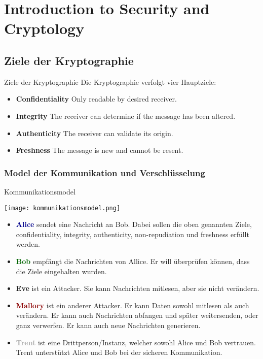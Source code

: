 \section{Introduction to Security and Cryptology}

\subsection{Ziele der Kryptographie}

\begin{definition}{Ziele der Kryptographie}
    Die Kryptographie verfolgt vier Hauptziele:
    \begin{itemize}
        \item \textbf{Confidentiality} Only readable by desired receiver.
        \item \textbf{Integrity} The receiver can determine if the message has been altered.
        \item \textbf{Authenticity} The receiver can validate its origin.
        \item \textbf{Freshness} The message is new and cannot be resent.
    \end{itemize}
\end{definition}


\subsubsection{Model der Kommunikation und Verschlüsselung}

\begin{definition}{Kommunikationsmodel}

    \texttt{[image: kommunikationsmodel.png]}

    \begin{itemize}
        \item \textcolor{darkblue}{\textbf{Alice}} sendet eine Nachricht an Bob. Dabei sollen die oben genannten Ziele, confidentiality, integrity, authenticity, non-repudiation und freshness erfüllt werden.
        \item \textcolor{darkgreen}{\textbf{Bob}} empfängt die Nachrichten von Allice. Er will überprüfen können, dass die Ziele eingehalten wurden.
        \item \textcolor{darktangerine}{\textbf{Eve}}  ist ein Attacker. Sie kann Nachrichten mitlesen, aber sie nicht verändern.
        \item \textcolor{darkred}{\textbf{Mallory}} ist ein anderer Attacker. Er kann Daten sowohl mitlesen als auch verändern. Er kann auch Nachrichten abfangen und später weitersenden, oder ganz verwerfen. Er kann auch neue Nachrichten generieren.
        \item \textcolor{darkgrey}{\textbf{Trent}} ist eine Drittperson/Instanz, welcher sowohl Alice und Bob vertrauen. Trent unterstützt Alice und Bob bei der sicheren Kommunikation.
    \end{itemize}
\end{definition}

